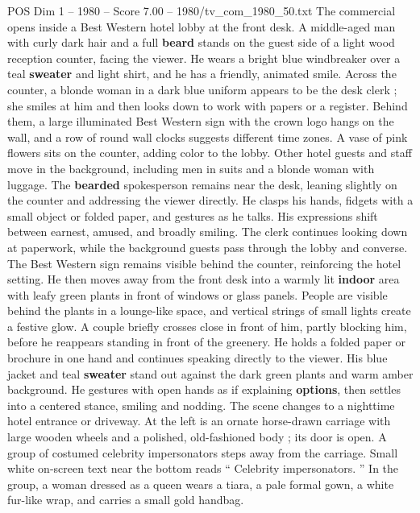 \begin{textsample}{POS Dim 1 – 1980 – Score 7.00 – 1980/tv\_com\_1980\_50.txt}  \label{ex:f1_pos_058}
The commercial opens inside a Best Western hotel lobby at the front desk.
A middle-aged man with curly dark hair and a full \textbf{beard} stands on the guest side of a light wood reception counter, facing the viewer.
He wears a bright blue windbreaker over a teal \textbf{sweater} and light shirt, and he has a friendly, animated smile.
Across the counter, a blonde woman in a dark blue uniform appears to be the desk clerk ; she smiles at him and then looks down to work with papers or a register.
Behind them, a large illuminated Best Western sign with the crown logo hangs on the wall, and a row of round wall clocks suggests different time zones.
A vase of pink flowers sits on the counter, adding color to the lobby.
Other hotel guests and staff move in the background, including men in suits and a blonde woman with luggage.
The \textbf{bearded} spokesperson remains near the desk, leaning slightly on the counter and addressing the viewer directly.
He clasps his hands, fidgets with a small object or folded paper, and gestures as he talks.
His expressions shift between earnest, amused, and broadly smiling.
The clerk continues looking down at paperwork, while the background guests pass through the lobby and converse.
The Best Western sign remains visible behind the counter, reinforcing the hotel setting.
He then moves away from the front desk into a warmly lit \textbf{indoor} area with leafy green plants in front of windows or glass panels.
People are visible behind the plants in a lounge-like space, and vertical strings of small lights create a festive glow.
A couple briefly crosses close in front of him, partly blocking him, before he reappears standing in front of the greenery.
He holds a folded paper or brochure in one hand and continues speaking directly to the viewer.
His blue jacket and teal \textbf{sweater} stand out against the dark green plants and warm amber background.
He gestures with open hands as if explaining \textbf{options}, then settles into a centered stance, smiling and nodding.
The scene changes to a nighttime hotel entrance or driveway.
At the left is an ornate horse-drawn carriage with large wooden wheels and a polished, old-fashioned body ; its door is open.
A group of costumed celebrity impersonators steps away from the carriage.
Small white on-screen text near the bottom reads “ Celebrity impersonators. ” In the group, a woman dressed as a queen wears a tiara, a pale formal gown, a white fur-like wrap, and carries a small gold handbag.

\end{textsample}
